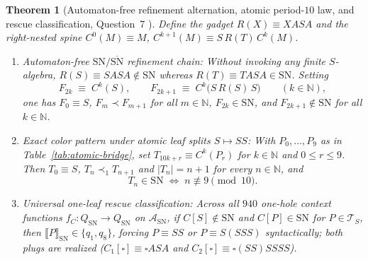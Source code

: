 \documentclass[11pt,reqno]{amsart}
\numberwithin{equation}{section}
\theoremstyle{plain}
\newtheorem{theorem}{Theorem}[section]
\theoremstyle{definition}
\theoremstyle{remark}
\newcommand{\TS}{\mathcal{T}_S}
\newcommand{\SN}{\mathrm{SN}}
\newcommand{\sem}[1]{\llbracket #1 \rrbracket}
\begin{document}
\begin{theorem}[Automaton-free refinement alternation, atomic period-$10$ law, and rescue classification, Question~7 {\cite[p.~81]{BarendregtEndrullisKlopWaldmann2017}}]\label{thm:question-7}
Define the gadget $R(X) \equiv X A S A$ and the right-nested spine $C^0(M) \equiv M$, $C^{k+1}(M) \equiv S\,R(T)\,C^k(M)$.
\begin{enumerate}[label=(\roman*),leftmargin=2.2em]
  \item \emph{Automaton-free $\SN / \overline{\SN}$ refinement chain:} Without invoking any finite $S$-algebra, $R(S) \equiv S A S A \notin \SN$ whereas $R(T) \equiv T A S A \in \SN$. Setting
  \begin{equation}\label{eq:q7-chain}
  F_{2k} \;\equiv\; C^k(S),
  \qquad
  F_{2k+1} \;\equiv\; C^k\bigl(S\,R(S)\,S\bigr)
  \qquad (k \in \mathbb{N}),
  \end{equation}
  one has $F_0 \equiv S$, $F_m \prec F_{m+1}$ for all $m \in \mathbb{N}$, $F_{2k} \in \SN$, and $F_{2k+1} \notin \SN$ for all $k \in \mathbb{N}$.
  \item \emph{Exact color pattern under atomic leaf splits $S \mapsto S S$:} With $P_0, \dots, P_9$ as in Table~\ref{tab:atomic-bridge}, set $T_{10k + r} \equiv C^k(P_r)$ for $k \in \mathbb{N}$ and $0 \le r \le 9$. Then $T_0 \equiv S$, $T_n \prec_1 T_{n+1}$ and $|T_n| = n + 1$ for every $n \in \mathbb{N}$, and
  \[
  T_n \in \SN \;\Longleftrightarrow\; n \not\equiv 9 \pmod{10}.
  \]
  \item \emph{Universal one-leaf rescue classification:} Across all $940$ one-hole context functions $f_C \colon Q_{\SN} \to Q_{\SN}$ on $\mathcal{A}_{\SN}$, if $C[S] \notin \SN$ and $C[P] \in \SN$ for $P \in \TS$, then $\sem{P}_{\SN} \in \{q_1, q_8\}$, forcing $P \equiv S S$ or $P \equiv S(S S S)$ syntactically; both plugs are realized ($C_1[\square] \equiv \square A S A$ and $C_2[\square] \equiv \square (S S) S S S S$).
\end{enumerate}
\end{theorem}
\end{document}
